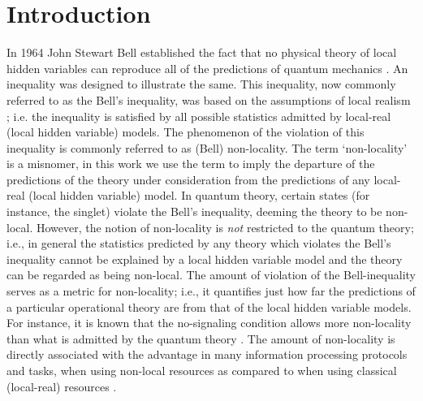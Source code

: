 \documentclass[%
 reprint,
 amsmath,amssymb,
 aps,
]{revtex4-1}
\theoremstyle{plain}
\begin{document}
\section{Introduction}
In 1964 John Stewart Bell established the fact that no physical theory of local hidden variables can reproduce all of the predictions of quantum mechanics \cite{bell1964einstein,bell1966problem,brunner2014bell}. An inequality was designed to illustrate the same. This inequality, now commonly referred to as the Bell's inequality, was based on the assumptions of local realism \cite{clauser1969proposed,freedman1972experimental}; i.e. the inequality is satisfied by all possible statistics admitted by local-real (local hidden variable) models. The phenomenon of the violation of this inequality is commonly referred to as (Bell) non-locality. The term `non-locality' is a misnomer, in this work we use the term to imply the departure of the predictions of the theory under consideration from the predictions of any local-real (local hidden variable) model.   
In quantum theory, certain states (for instance, the singlet) violate the Bell's inequality, deeming the theory to be non-local. However, the notion of non-locality is \textit{not} restricted to the quantum theory; i.e., in general the statistics predicted by any theory which violates the Bell's inequality cannot be explained by a local hidden variable model and the theory can be regarded as being non-local. 
The amount of violation of the Bell-inequality serves as a metric for non-locality; i.e., it quantifies just how far the predictions of a particular operational theory are from that of the local hidden variable models. For instance, it is known that the no-signaling condition allows more non-locality than what is admitted by the quantum theory \cite{barrett2005popescu,chakrabarty2014ctc}.
The amount of non-locality is directly associated with the advantage in many information processing protocols and tasks, when using non-local resources as compared to when using classical (local-real) resources \cite{horodecki1996teleportation,adhikari2008quantum,chakrabarty2011deletion,chaturvedi2015measurement}. \\
\end{document}
